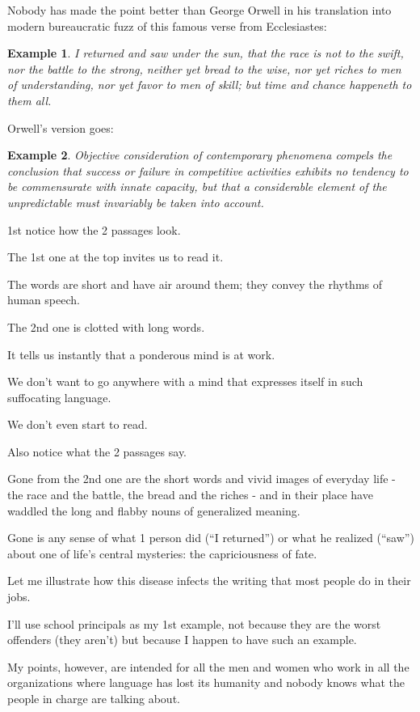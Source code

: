 \documentclass{book}
\numberwithin{equation}{section}
\newtheorem{example}{Example}[chapter]
\begin{document}
%
Nobody has made the point better than George Orwell in his translation into modern bureaucratic fuzz of this famous verse from Ecclesiastes:
\begin{example}
    I returned and saw under the sun, that the race is not to the swift, nor the battle to the strong, neither yet bread to the wise, nor yet riches to men of understanding, nor yet favor to men of skill; but time and chance happeneth to them all.
\end{example}
Orwell's version goes:
\begin{example}
    Objective consideration of contemporary phenomena compels the conclusion that success or failure in competitive activities exhibits no tendency to be commensurate with innate capacity, but that a considerable element of the unpredictable must invariably be taken into account.
\end{example}
1st notice how the 2 passages look.

The 1st one at the top invites us to read it.

The words are short and have air around them; they convey the rhythms of human speech.

The 2nd one is clotted with long words.

It tells us instantly that a ponderous mind is at work.

We don't want to go anywhere with a mind that expresses itself in such suffocating language.

We don't even start to read.

%
Also notice what the 2 passages say.

Gone from the 2nd one are the short words and vivid images of everyday life - the race and the battle, the bread and the riches - and in their place have waddled the long and flabby nouns of generalized meaning.

Gone is any sense of what 1 person did (``I returned'') or what he realized (``saw'') about one of life's central mysteries: the capriciousness of fate.

%
Let me illustrate how this disease infects the writing that most people do in their jobs.

I'll use school principals as my 1st example, not because they are the worst offenders (they aren't) but because I happen to have such an example.

My points, however, are intended for all the men and women who work in all the organizations where language has lost its humanity and nobody knows what the people in charge are talking about.
\end{document}
